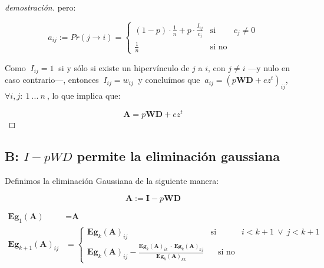 \begin{proof}[demostración]
\noindent pero: 
\vspace{1em}

\begin{equation*}
    a_{ij} := Pr(j \longrightarrow i) = \left\{ 
                                            \begin{array}{lcc}
                                            (1 - p)\cdot \frac{1}{n} + p \cdot \frac{I_{ij}}{c_j}      &  \text{si}    & c_j \neq 0\\
                                            \frac{1}{n}                                                &  \text{si no}  &
                                            \end{array}
                                        \right.
\end{equation*}
\vspace{1em}

Como $\ I_{ij} = 1\ $ si y sólo si existe un hipervínculo de $j$ a $i$, con $j \neq i$ ---y nulo en caso contrario---, entonces $\ I_{ij} = w_{ij}\ $ y concluímos que $\ a_{ij} = (p\textbf{W}\textbf{D} + ez^t)_{ij}$, $\forall i, j:\ 1\ ...\ n\ $,  lo que implica que:
\vspace{1em}

\begin{equation*}
    \textbf{A} = p\textbf{W}\textbf{D} + ez^t
\end{equation*}
\vspace{1em}

\end{proof}



\subsection{B: $I - pWD$ permite la eliminación gaussiana}\label{A.2}

Definimos la eliminación Gaussiana de la siguiente manera:

\begin{equation*}
\textbf{A} := \textbf{I} - p\textbf{WD}
\end{equation*}

\begin{align*}
    \textbf{Eg}_{1}(\textbf{A}) \ \ \  &=   \textbf{A}
                            \\
    \textbf{Eg}_{k+1}(\textbf{A})_{ij}  &=  \left\{ 
                                    \begin{array}{lcc}
                                    \textbf{Eg}_{k}(\textbf{A})_{ij}  &   \text{si}    & i < k+1 \ \vee \  j < k+1 \\
                                    \textbf{Eg}_{k}(\textbf{A})_{ij} - \frac {\textbf{Eg}_{k}(\textbf{A})_{ik} \ \cdot \ \textbf{Eg}_{k}(\textbf{A})_{kj}}{\textbf{Eg}_{k}(\textbf{A})_{kk}}    &  \ \ \ \  \text{si no} &
                                    \end{array}
                                \right.\
\end{align*}

